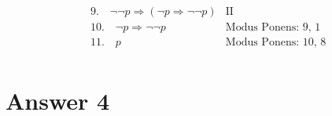 \documentclass[12pt]{article}
\begin{document}
\begin{align*}
    & 9. \hspace{1em} \neg \neg p \Rightarrow (\neg p \Rightarrow \neg \neg p)                                                                                                                              & \text{II} \\
    & 10. \hspace{1em} \neg p \Rightarrow \neg \neg p                                                                                                                                                       & \text{Modus Ponens: 9, 1} \\
    & 11. \hspace{1em} p                                                                                                                                                                                    & \text{Modus Ponens: 10, 8} \\                                                                                      
\end{align*}


\section*{Answer 4}

\end{document}
